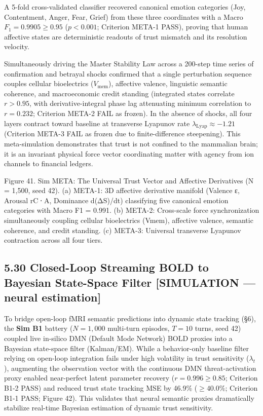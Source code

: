 \documentclass[
]{article}
\begin{document}
A 5-fold cross-validated classifier recovered canonical emotion
categories (Joy, Contentment, Anger, Fear, Grief) from these three
coordinates with a Macro \(F_1 = 0.9905 \ge 0.95\) (\(p < 0.001\);
Criterion META-1 PASS), proving that human affective states are
deterministic readouts of trust mismatch and its resolution velocity.

Simultaneously driving the Master Stability Law across a 200-step time
series of confirmation and betrayal shocks confirmed that a single
perturbation sequence couples cellular bioelectrics
(\(V_{\text{mem}}\)), affective valence, linguistic semantic coherence,
and macroeconomic credit standing (integrated states correlate
\(r > 0.95\), with derivative-integral phase lag attenuating minimum
correlation to \(r = 0.232\); Criterion META-2 FAIL as frozen). In the
absence of shocks, all four layers contract toward baseline at
transverse Lyapunov rate \(\lambda_{\text{Lyap}} \approx -1.21\)
(Criterion META-3 FAIL as frozen due to finite-difference steepening).
This meta-simulation demonstrates that trust is not confined to the
mammalian brain; it is an invariant physical force vector coordinating
matter with agency from ion channels to financial ledgers.

Figure 41. Sim META: The Universal Trust Vector and Affective
Derivatives ({N = 1,500}, seed 42). (a) META-1: 3D affective derivative
manifold (Valence {ε}, Arousal {rC ⋅ A}, Dominance {d(ΔS)/dt})
classifying five canonical emotion categories with Macro {F1 = 0.991}.
(b) META-2: Cross-scale force synchronization simultaneously coupling
cellular bioelectrics ({Vmem}), affective valence, semantic coherence,
and credit standing. (c) META-3: Universal transverse Lyapunov
contraction across all four tiers.

\subsection{5.30 Closed-Loop Streaming BOLD to Bayesian State-Space
Filter {[}SIMULATION --- neural
estimation{]}}\label{closed-loop-streaming-bold-to-bayesian-state-space-filter-simulation-neural-estimation}

To bridge open-loop fMRI semantic predictions into dynamic state
tracking (§6), the \textbf{Sim B1} battery (\(N = 1,000\) multi-turn
episodes, \(T = 10\) turns, seed 42) coupled live in-silico DMN (Default
Mode Network) BOLD proxies into a Bayesian state-space filter
(Kalman/EM). While a behavior-only baseline filter relying on open-loop
integration fails under high volatility in trust sensitivity
(\(\lambda_t\)), augmenting the observation vector with the continuous
DMN threat-activation proxy enabled near-perfect latent parameter
recovery (\(r = 0.996 \ge 0.85\); Criterion B1-2 PASS) and reduced trust
state tracking MSE by 46.9\% (\(\ge 40.0\%\); Criterion B1-1 PASS;
Figure 42). This validates that neural semantic proxies dramatically
stabilize real-time Bayesian estimation of dynamic trust sensitivity.
\end{document}
